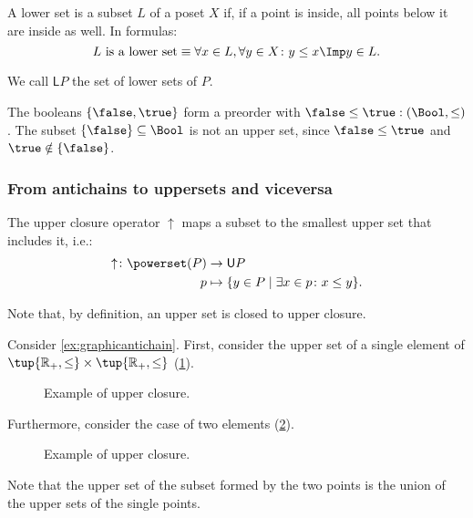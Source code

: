 \begin{definition}
\label{def:lowerset}
A lower set is a subset $L$ of a poset $X$ if, if a point is inside, all points below it are inside as well. In formulas:
\begin{equation}
\text{$L$ is a lower set} \equiv \forall x\in L, \forall y\in X\colon y\leq x \Imp y\in L.
\end{equation}
\end{definition}
\begin{remark}
We call $\mathsf{L}P$ the set of lower sets of $P$.
\end{remark}

\begin{example}
The booleans $\{\false, \true \}$ form a preorder with $\false \leq \true:(\Bool,\leq)$ . The subset $\{\false\} \subseteq \Bool$ is not an upper set, since $\false \leq \true$ and $\true \notin \{\false \}$.	
\end{example}

\subsubsection{From antichains to uppersets and viceversa}
\begin{definition}
\label{def:upperclosure}
The upper closure operator $\uparrow$ maps a subset to the smallest upper set that includes it, i.e.:
\begin{equation}
    \begin{aligned}
    \uparrow \colon \powerset(P)&\to \mathsf{U}P\\
    p&\mapsto \{y\in P \mid \exists x\in p \colon x\leq y\}.
    \end{aligned}
\end{equation}
\end{definition}
\begin{remark}
Note that, by definition, an upper set is closed to upper closure.
\end{remark}

\begin{example}
Consider \cref{ex:graphicantichain}. First, consider the upper set of a single element of $\tup{\mathbb{R}_+,\leq}\times \tup{\mathbb{R}_+,\leq}$ (\cref{fig:upperclosure_1}).
\begin{figure}[h!]
\begin{center}
\end{center}
\caption{Example of upper closure. \label{fig:upperclosure_1}}
\end{figure}
Furthermore, consider the case of two elements (\cref{fig:upperclosure_2}).
\begin{figure}[h!]
\begin{center}
\end{center}
\caption{Example of upper closure. \label{fig:upperclosure_2}}
\end{figure}
Note that the upper set of the subset formed by the two points is the union of the upper sets of the single points.
\end{example}


